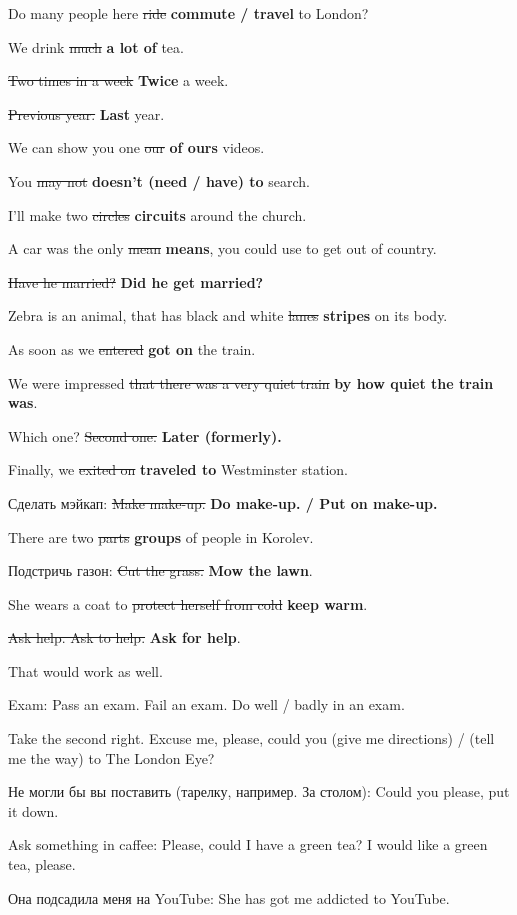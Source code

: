 \documentclass[10pt,a4paper]{article}
\newlength{\OriginalParIndent}
\begin{document}
\begin{description}[leftmargin=\OriginalParIndent,style=nextline,before={\renewcommand\makelabel[1]{##1 ~--}}]
\item[] Do many people here \sout{ride} \textbf{commute / travel} to London?
\item[] We drink \sout{much} \textbf{a lot of} tea.
\item[] \sout{Two times in a week} \textbf{Twice} a week.
\item[] \sout{Previous year.} \textbf{Last} year.
\item[] We can show you one \sout{our} \textbf{of ours} videos.
\item[] You \sout{may not} \textbf{doesn't (need / have) to} search.
\item[] I'll make two \sout{circles} \textbf{circuits} around the church.
\item[] A car was the only \sout{mean} \textbf{means}, you could use to get out of country.
\item[] \sout{Have he married?} \textbf{Did he get married?}
\item[] Zebra is an animal, that has black and white \sout{lanes} \textbf{stripes} on its body.
\item[] As soon as we \sout{entered} \textbf{got on} the train.
\item[] We were impressed \sout{that there was a very quiet train} \textbf{by
        how quiet the train was}.
\item[] Which one? \sout{Second one.} \textbf{Later (formerly).}
\item[] Finally, we \sout{exited on} \textbf{traveled to} Westminster station.
\item[] Сделать мэйкап: \sout{Make make-up.} \textbf{Do make-up. / Put on make-up.}
\item[] There are two \sout{parts} \textbf{groups} of people in Korolev.
\item[] Подстричь газон: \sout{Cut the grass.} \textbf{Mow the lawn}.
\item[] She wears a coat to \sout{protect herself from cold} \textbf{keep warm}.
\item[] \sout{Ask help. Ask to help.} \textbf{Ask for help}.

\item[] That would work as well.
\item[] Exam: Pass an exam. Fail an exam. Do well / badly in an exam.
\item[] Take the second right. Excuse me, please, could you (give me directions) /
        (tell me the way) to The London Eye?
\item[] Не могли бы вы поставить (тарелку, например. За столом): Could you please, put it down.
\item[] Ask something in caffee: Please, could I have a green tea? I would like a green tea, please.
\item[] Она подсадила меня на YouTube: She has got me addicted to YouTube.
\end{description}
\end{document}
